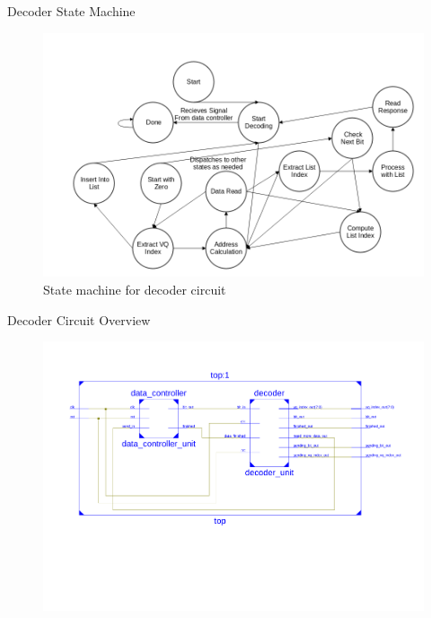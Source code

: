 \documentclass[10pt, compress]{beamer}
\begin{document}
\begin{frame}{Decoder State Machine}
    
    \begin{figure}
    \centering
    \includegraphics[scale=0.31]{decoder_states_v2.png}
    \caption{State machine for decoder circuit}
    \end{figure}
    

\end{frame}

\begin{frame}{Decoder Circuit Overview}

    \begin{figure}
    \centering
    \includegraphics[scale=0.4]{decoder_top_diagram.pdf}
    \end{figure}    

\end{frame}
\end{document}

